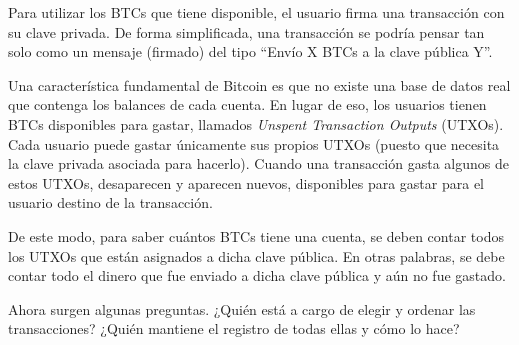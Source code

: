 %
Para utilizar los BTCs que tiene disponible, el usuario firma una transacción con su clave privada.
%
De forma simplificada, una transacción se podría pensar tan solo como un mensaje (firmado) del tipo
\textquotedblleft Envío X BTCs a la clave pública Y\textquotedblright.

Una característica fundamental de Bitcoin es que no existe una base de datos real que contenga los
balances de cada cuenta.
%
En lugar de eso, los usuarios tienen BTCs disponibles para gastar, llamados
\textit{Unspent Transaction Outputs} (UTXOs).
%
Cada usuario puede gastar únicamente sus propios UTXOs
(puesto que necesita la clave privada asociada para hacerlo).
%
Cuando una transacción gasta algunos de estos UTXOs, desaparecen y aparecen nuevos,
disponibles para gastar para el usuario destino de la transacción.
%

De este modo, para saber cuántos BTCs tiene una cuenta, se deben contar todos los UTXOs que están
asignados a dicha clave pública.
%
En otras palabras, se debe contar todo el dinero que fue enviado a dicha clave pública y aún no
fue gastado.

Ahora surgen algunas preguntas. ¿Quién está a cargo de elegir y ordenar las transacciones?
¿Quién mantiene el registro de todas ellas y cómo lo hace?



